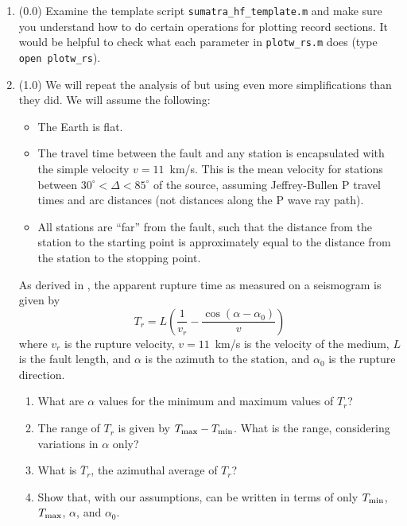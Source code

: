 \documentclass[11pt,titlepage,fleqn]{article}
\begin{document}
\begin{enumerate}
\item (0.0) Examine the template script \verb+sumatra_hf_template.m+ and make sure you understand how to do certain operations for plotting record sections. It would be helpful to check what each parameter in \verb+plotw_rs.m+ does (type \verb+open plotw_rs+).

\item (1.0) We will repeat the analysis of \citet{Ni2005} but using even more simplifications than they did. We will assume the following:
%
\begin{itemize}
\item The Earth is flat.
\item The travel time between the fault and any station is encapsulated with the simple velocity $v = 11$~km/s. This is the mean velocity for stations between $30^\circ < \Delta < 85^\circ$ of the source, assuming Jeffrey-Bullen P travel times and arc distances (not distances along the P wave ray path).
\item All stations are ``far'' from the fault, such that the distance from the station to the starting point is approximately equal to the distance from the station to the stopping point.
\end{itemize}
%
As derived in \citet[][Section 4.3.2]{SteinWysession}, the apparent rupture time as measured on a seismogram is given by
%
\begin{equation}
T_r = L\left(\frac{1}{v_r} - \frac{\cos(\alpha-\alpha_0)}{v}\right)
\label{Tr}
\end{equation}
%
where $v_r$ is the rupture velocity, $v = 11$~km/s is the velocity of the medium, $L$ is the fault length, and $\alpha$ is the azimuth to the station, and $\alpha_0$ is the rupture direction.
%
\begin{enumerate}
\item What are $\alpha$ values for the minimum and maximum values of $T_r$?
\item The range of $T_r$ is given by $T_{\rm max} - T_{\rm min}$.
What is the range, considering variations in $\alpha$ only?
\item What is $\overline{T}_r$, the azimuthal average of $T_r$?
\item Show that, with our assumptions,  can be written in terms of only $T_{\rm min}$, $T_{\rm max}$, $\alpha$, and $\alpha_0$.
\end{enumerate}



\end{enumerate}
\end{document}
